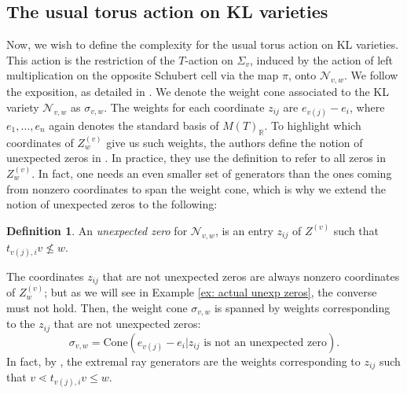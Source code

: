 \documentclass[11pt]{amsart}
\theoremstyle{definition}
\theoremstyle{definition}
\newtheorem{definition}[theorem]{Definition}
\theoremstyle{definition}
\theoremstyle{definition}
\newcommand{\Nvw}{\mathcal{N}_{v,w}}
\newcommand{\Zg}{Z^{(v)}_w}
\begin{document}
\subsection{The usual torus action on KL varieties} Now, we wish to define the complexity for the usual torus action on KL varieties. This action is the restriction of the  $T$-action on $\Sigma_v$, induced by the action of left multiplication on the opposite Schubert cell via the map $\pi$, onto $\Nvw$. We follow the exposition, as detailed in \cite{donten2021complexity}. We denote the weight cone associated to the KL variety $\Nvw$ as $\sigma_{v,w}$. 
The weights for each coordinate $z_{ij}$ are $e_{v(j)}-e_i$, where $e_1, \ldots, e_n$ again denotes the standard basis of $M(T)_{\mathbb R}$. To highlight which coordinates of $\Zg$ give us such weights, the authors define the notion of unexpected zeros in \cite[Def 4.8]{donten2021complexity}. In practice, they use the definition to refer to all zeros in $\Zg$. In fact, one needs an even smaller set of generators than the ones coming from nonzero coordinates to span the weight cone, which is why we extend the notion of unexpected zeros to the following:


\begin{definition}\label{def: unexpected zero}
    An \textit{unexpected zero} for $\Nvw$, is an entry $z_{ij}$ of $Z^{(v)}$ such that $t_{v(j),i}v \not\leq w$. 
\end{definition} 
\noindent
The coordinates $z_{ij}$ that are not unexpected zeros
are always nonzero coordinates of $\Zg$; but as we will see in Example \ref{ex: actual unexp zeros}, the converse must not hold. Then, the weight cone $\sigma_{v,w}$ is spanned by weights corresponding to the $z_{ij}$ that are not unexpected zeros:
$$\sigma_{v,w} = \mathrm{ Cone } (e_{v(j)}-e_i|z_{ij} \text{ is not an unexpected zero}).$$
In fact, by \cite[Theorem 4.11]{donten2021complexity}, the extremal ray generators are the weights corresponding to $z_{ij}$ such that $v \lessdot t_{v(j),i}v \leq w$. 
\end{document}
